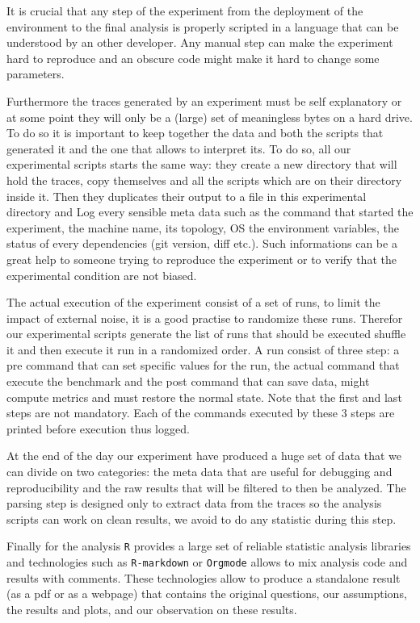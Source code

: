 It is crucial that any step of the experiment from the deployment of the
environment to the final analysis is properly scripted in a language that can
be understood by an other developer. Any manual step can make the experiment
hard to reproduce and an obscure code might make it hard to change some
parameters.

Furthermore the traces generated by an experiment must be self explanatory or
at some point they will only be a (large) set of meaningless bytes on a hard
drive. To do so it is important to keep together the data and both the scripts
that generated it and the one that allows to interpret its. To do so, all our
experimental scripts starts the same way: they create a new directory that
will hold the traces, copy themselves and all the scripts which are on their
directory inside it. Then they duplicates their output to a file in this
experimental directory and Log every sensible meta data such as the
command that started the experiment, the machine name, its topology, \gls{OS}
the environment variables, the status of every dependencies (git version, diff
etc.). Such informations can be a great help to someone trying to reproduce
the experiment or to verify that the experimental condition are not biased.

The actual execution of the experiment consist of a set of runs, to limit the
impact of external noise, it is a good practise to randomize these runs.
Therefor our experimental scripts generate the list of runs that should be
executed shuffle it and then execute it run in a randomized order. A run
consist of three step: a pre command that can set specific values for the run,
the actual command that execute the benchmark and the post command that can
save data, might compute metrics and must restore the normal state. Note that
the first and last steps are not mandatory. Each of the commands executed by
these 3 steps are printed before execution thus logged.

At the end of the day our experiment have produced a huge set of data that we
can divide on two categories: the meta data that are useful for debugging and
reproducibility and the raw results that will be filtered to then be analyzed.
The parsing step is designed only to extract data from the traces so the
analysis scripts can work on clean results, we avoid to do any statistic
during this step.

Finally for the analysis \texttt{R} provides a large set of reliable statistic
analysis libraries and technologies such as \texttt{R-markdown} or
\texttt{Orgmode} allows to mix analysis code and results with comments. These
technologies allow to produce a standalone result (as a pdf or as a webpage)
that contains the original questions, our assumptions, the results and plots,
and our observation on these results.

